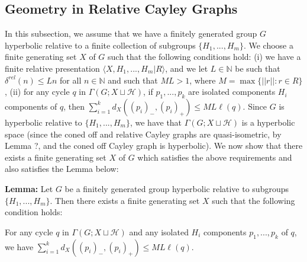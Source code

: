 \documentclass[12pt]{article}
\newcommand{\vs}{\vskip10pt}
\begin{document}
	\subsection{Geometry in Relative Cayley Graphs}
	
	In this subsection, we assume that we have a finitely generated group $G$ hyperbolic relative to a finite collection of subgroups $\{H_1,...,H_m\}$. We choose a finite generating set $X$ of $G$ such that the following conditions hold: (i) we have a finite relative presentation $\langle X, H_1,...,H_m \vert R \rangle$, and we let $L \in \mathbb{N}$ be such that $\delta^{rel}(n) \leq Ln$ for all $n \in \mathbb{N}$ and such that $ML > 1$, where $M = \max \{\vert \vert r \vert \vert : r \in R\}$, (ii) for any cycle $q$ in $\Gamma(G; X \sqcup \mathcal{H})$, if $p_1,...,p_k$ are isolated components $H_i$ components of $q$, then $\sum_{i=1}^k d_X((p_i)_-, (p_i)_+) \leq ML \ell(q)$. Since $G$ is hyperbolic relative to $\{H_1,...,H_m\}$, we have that $\Gamma(G; X \sqcup \mathcal{H})$ is a hyperbolic space (since the coned off and relative Cayley graphs are quasi-isometric, by Lemma ?, and the coned off Cayley graph is hyperbolic). We now show that there exists a finite generating set $X$ of $G$ which satisfies the above requirements and also satisfies the Lemma below: 
	
	\vs 
	
	\textbf{Lemma:} Let $G$ be a finitely generated group hyperbolic relative to subgroups $\{H_1,...,H_m\}$. Then there exists a finite generating set $X$ such that the following condition holds: 
	
	\vs 
	
	For any cycle $q$ in $\Gamma(G; X \sqcup \mathcal{H})$ and any isolated $H_i$ components $p_1,...,p_k$ of $q$, we have $\sum_{i=1}^k d_X((p_i)_{-}, (p_i)_{+}) \leq ML \ell(q)$. 
	
\end{document}

